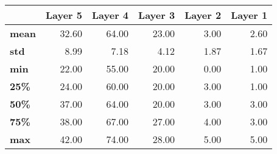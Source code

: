 \begin{tabular}{lrrrrr}
\toprule
{} &  Layer 5 &  Layer 4 &  Layer 3 &  Layer 2 &  Layer 1 \\
\midrule
\textbf{mean} &    32.60 &    64.00 &    23.00 &     3.00 &     2.60 \\
\textbf{std } &     8.99 &     7.18 &     4.12 &     1.87 &     1.67 \\
\textbf{min } &    22.00 &    55.00 &    20.00 &     0.00 &     1.00 \\
\textbf{25\% } &    24.00 &    60.00 &    20.00 &     3.00 &     1.00 \\
\textbf{50\% } &    37.00 &    64.00 &    20.00 &     3.00 &     3.00 \\
\textbf{75\% } &    38.00 &    67.00 &    27.00 &     4.00 &     3.00 \\
\textbf{max } &    42.00 &    74.00 &    28.00 &     5.00 &     5.00 \\
\bottomrule
\end{tabular}
